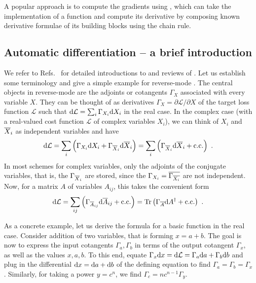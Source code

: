 A popular approach is to compute the gradients using , which can take the implementation of a function and compute its derivative by composing known derivative formulae of its building blocks using the chain rule.


\subsection{Automatic differentiation -- a brief introduction}


We refer to Refs.~\cite{baydin2018, margossian2019} for detailed introductions to and reviews of .
%
Let us establish some terminology and give a simple example for reverse-mode .
%
The central objects in reverse-mode are the adjoints or cotangents $\Gamma_{X}$ associated with every variable $X$.
%
They can be thought of as derivatives $\Gamma_X = \partial \mathcal{L} / \partial X$ of the target loss function $\mathcal{L}$ such that $\,\! \mathrm{d} {\mathcal{L}} \,\! = \sum_i \Gamma_{X_i} \,\! \mathrm{d} {X_i} \,\!$ in the real case.
%
In the complex case (with a real-valued cost function $\mathcal{L}$ of complex variables $X_i$), we can think of $X_i$ and $\overline{X}_i$ as independent variables and have 
\begin{equation}
    \d{\mathcal{L}} = \sum_i \left( \Gamma_{X_i} \d{X_i} + \Gamma_{\conj{X}_i} \d{\conj{X}_i} \right) = \sum_i \left( \Gamma_{\conj{X}_i} \d{\conj{X}_i} + \text{c.c.} \right)
    ~.
\end{equation}
%
In most  schemes for complex variables, only the adjoints of the conjugate variables, that is, the $\Gamma_{\overline{X}_i}$ are stored, since the $\Gamma_{X_i} = \overline{\Gamma_{\overline{X_i}}}$ are not independent.
%
Now, for a matrix $A$ of variables $A_{ij}$, this takes the convenient form
\begin{equation}
    \,\! \mathrm{d} {\mathcal{L}} \,\! = \sum_{ij} \left( \Gamma_{\overline{A}_{ij}} \,\! \mathrm{d} {\overline{A}_{ij}} \,\! + \text{c.c.} \right) = \mathrm{Tr}\left( {\Gamma_{\overline{A}} \,\! \mathrm{d} {A} \,\!^\dagger + \text{c.c.}} \right)
    ~.
\end{equation}

As a concrete example, let us derive the  formula for a basic function in the real case.
%
Consider addition of two variables, that is forming $x = a + b$.
%
The goal is now to express the input cotangents $\Gamma_a, \Gamma_b$ in terms of the output cotangent $\Gamma_x$, as well as the values $x, a, b$.
%
To this end, equate $\Gamma_x \d{x} = \d{\mathcal{L}} = \Gamma_a \d{a} + \Gamma_b \d{b}$ and plug in the differential $\,\! \mathrm{d} {x} \,\! = \,\! \mathrm{d} {a} \,\! + \,\! \mathrm{d} {b} \,\!$ of the defining equation to find $\Gamma_a = \Gamma_b = \Gamma_x$.
%
Similarly, for taking a power $y = c^n$, we find $\Gamma_c = n c^{n-1} \Gamma_y$.



